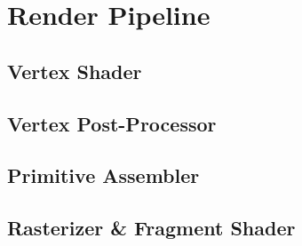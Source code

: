 \section{Render Pipeline}
\subsection{Vertex Shader}
\subsection{Vertex Post-Processor}
\subsection{Primitive Assembler}
\subsection{Rasterizer \& Fragment Shader}

